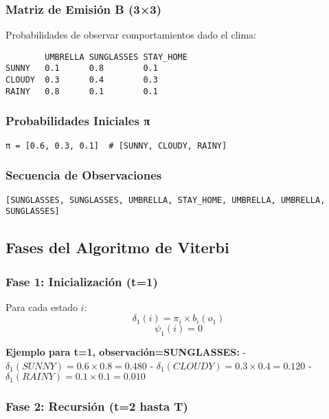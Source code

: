 \documentclass[
]{article}
\begin{document}
\subsubsection{Matriz de Emisión B
(3×3)}\label{matriz-de-emisiuxf3n-b-33}

Probabilidades de observar comportamientos dado el clima:

\begin{verbatim}
        UMBRELLA SUNGLASSES STAY_HOME
SUNNY   0.1      0.8        0.1
CLOUDY  0.3      0.4        0.3
RAINY   0.8      0.1        0.1
\end{verbatim}

\subsubsection{Probabilidades Iniciales
π}\label{probabilidades-iniciales-ux3c0}

\begin{verbatim}
π = [0.6, 0.3, 0.1]  # [SUNNY, CLOUDY, RAINY]
\end{verbatim}

\subsubsection{Secuencia de
Observaciones}\label{secuencia-de-observaciones}

\begin{verbatim}
[SUNGLASSES, SUNGLASSES, UMBRELLA, STAY_HOME, UMBRELLA, UMBRELLA, SUNGLASSES]
\end{verbatim}

\subsection{Fases del Algoritmo de
Viterbi}\label{fases-del-algoritmo-de-viterbi}

\subsubsection{Fase 1: Inicialización
(t=1)}\label{fase-1-inicializaciuxf3n-t1}

Para cada estado \(i\): \[\delta_1(i) = \pi_i \times b_i(o_1)\]
\[\psi_1(i) = 0\]

\textbf{Ejemplo para t=1, observación=SUNGLASSES:} -
\(\delta_1(SUNNY) = 0.6 \times 0.8 = 0.480\) -
\(\delta_1(CLOUDY) = 0.3 \times 0.4 = 0.120\) -
\(\delta_1(RAINY) = 0.1 \times 0.1 = 0.010\)

\subsubsection{Fase 2: Recursión (t=2 hasta
T)}\label{fase-2-recursiuxf3n-t2-hasta-t}
\end{document}
